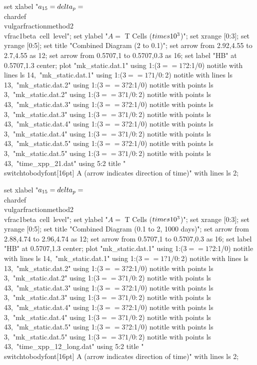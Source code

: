   set xlabel "$a_{15} = \\delta_p = $\\chardef\\vulgarfractionmethod2\\vfrac1{beta~cell~level}";
  set ylabel "$A = $ T Cells ($\\times 10^3$)";
  set xrange [0:3];
  set yrange [0:5];
  set title "Combined Diagram (2 to 0.1)";
  set arrow from 2.92,4.55 to 2.7,4.55 as 12;
  set arrow from 0.5707,1 to 0.5707,0.3 as 16;
  set label "HB" at 0.5707,1.3 center;
  plot "mk_static.dat.1" using 1:($3==1?$2:1/0) notitle with lines ls 14,\
       "mk_static.dat.1" using 1:($3==1?1/0:$2) notitle with lines ls 13,\
       "mk_static.dat.2" using 1:($3==3?$2:1/0) notitle with points ls 3,\
       "mk_static.dat.2" using 1:($3==3?1/0:$2) notitle with points ls 43,\
       "mk_static.dat.3" using 1:($3==3?$2:1/0) notitle with points ls 3,\
       "mk_static.dat.3" using 1:($3==3?1/0:$2) notitle with points ls 43,\
       "mk_static.dat.4" using 1:($3==3?$2:1/0) notitle with points ls 3,\
       "mk_static.dat.4" using 1:($3==3?1/0:$2) notitle with points ls 43,\
       "mk_static.dat.5" using 1:($3==3?$2:1/0) notitle with points ls 3,\
       "mk_static.dat.5" using 1:($3==3?1/0:$2) notitle with points ls 43,\
       "time_xpp_21.dat" using 5:2 title "\\switchtobodyfont[16pt] A (arrow indicates direction of time)" with lines ls 2;
\stopGNUPLOTscript

\startGNUPLOTscript[bifurcation_combined_12_long]
  set xlabel "$a_{15} = \\delta_p = $\\chardef\\vulgarfractionmethod2\\vfrac1{beta~cell~level}";
  set ylabel "$A = $ T Cells ($\\times 10^3$)";
  set xrange [0:3];
  set yrange [0:5];
  set title "Combined Diagram (0.1 to 2, 1000 days)";
  set arrow from 2.88,4.74 to 2.96,4.74 as 12;
  set arrow from 0.5707,1 to 0.5707,0.3 as 16;
  set label "HB" at 0.5707,1.3 center;
  plot "mk_static.dat.1" using 1:($3==1?$2:1/0) notitle with lines ls 14,\
       "mk_static.dat.1" using 1:($3==1?1/0:$2) notitle with lines ls 13,\
       "mk_static.dat.2" using 1:($3==3?$2:1/0) notitle with points ls 3,\
       "mk_static.dat.2" using 1:($3==3?1/0:$2) notitle with points ls 43,\
       "mk_static.dat.3" using 1:($3==3?$2:1/0) notitle with points ls 3,\
       "mk_static.dat.3" using 1:($3==3?1/0:$2) notitle with points ls 43,\
       "mk_static.dat.4" using 1:($3==3?$2:1/0) notitle with points ls 3,\
       "mk_static.dat.4" using 1:($3==3?1/0:$2) notitle with points ls 43,\
       "mk_static.dat.5" using 1:($3==3?$2:1/0) notitle with points ls 3,\
       "mk_static.dat.5" using 1:($3==3?1/0:$2) notitle with points ls 43,\
       "time_xpp_12_long.dat" using 5:2 title "\\switchtobodyfont[16pt] A (arrow indicates direction of time)" with lines ls 2;
\stopGNUPLOTscript

